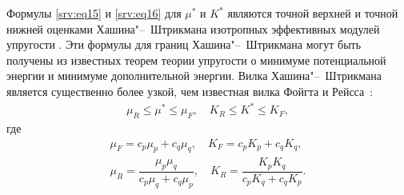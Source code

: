 Формулы \eqref{srv:eq15} и \eqref{srv:eq16} для $\mu^{*}$ и $K^{*}$ являются точной верхней и точной нижней оценками Хашина"--~Штрикмана изотропных эффективных модулей упругости \cite{Christensen1979,Shermergor1979}. Эти формулы для границ Хашина"--~Штрикмана могут быть получены из известных теорем теории упругости о минимуме потенциальной энергии и минимуме дополнительной энергии. Вилка Хашина"--~Штрикмана является существенно более узкой, чем известная вилка Фойгта и Рейсса~\mbox{\cite{Christensen1979,Shermergor1979}:}
\begin{gather}
\mu_{R} \leq \mu^{*} \leq \mu_{F},\quad K_{R} \leq K^{*} \leq K_{F},
\end{gather}
где
\begin{equation}\label{srv:eq17}
\begin{array}{ll}
\mu_{F}=c_{p}\mu_{p}+c_{q}\mu_{q}, \quad K_{F}=c_{p}K_{p}+c_{q}K_{q},\\[2mm]
\mu_{R}=\dfrac{\mu_{p}\mu_{q}}{c_{p}\mu_{q}+c_{q}\mu_{p}},\quad K_{R}=\dfrac{K_{p}K_{q}}{c_{p}K_{q}+c_{q}K_{p}}.
\end{array}
\end{equation}

